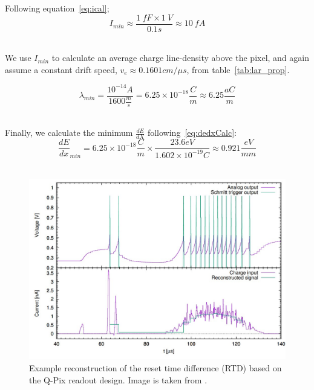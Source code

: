 Following equation~\ref{eq:ical};
\begin{equation}
I_{min} \approx \frac{1~fF \times  1~V}{0.1 \unit{s}} \approx 10~\unit{fA}
\end{equation}~\label{eq:icalc_min}

We use $I_{min}$ to calculate an average charge line-density above the pixel, and again assume a constant drift speed, $v_{e} \approx 0.1601 \unit{cm/\mu s}$, from table~\ref{tab:lar_prop}.

\begin{equation}
\lambda_{min} = \frac{10^{-14} A}{1600 \frac{m}{s}} = 6.25\times 10^{-18} \frac{C}{m} \approx 6.25 \frac{aC}{m}
\end{equation}
~\label{eq:lambdaMin}

Finally, we calculate the minimum $\frac{dE}{dX}$ following~\ref{eq:dedxCalc}:
\begin{equation}
\frac{dE}{dx}_{min} = 6.25\times 10^{-18} \frac{C}{m} \times  \frac{23.6 eV}{1.602\times 10^{-19} C} \approx 0.921 \frac{eV}{mm}
\end{equation}
~\label{eq:dedxMin}

\begin{figure}[]
\centering
\includegraphics[width=\textwidth]{images/qpix_rtd_reconstruction_example.jpg}
\caption{Example reconstruction of the reset time difference (RTD) based on the Q-Pix readout design. Image is taken from \citep{qpix:nygren:mei}.}
\end{figure}
~\label{fig:qpixRecon1}

